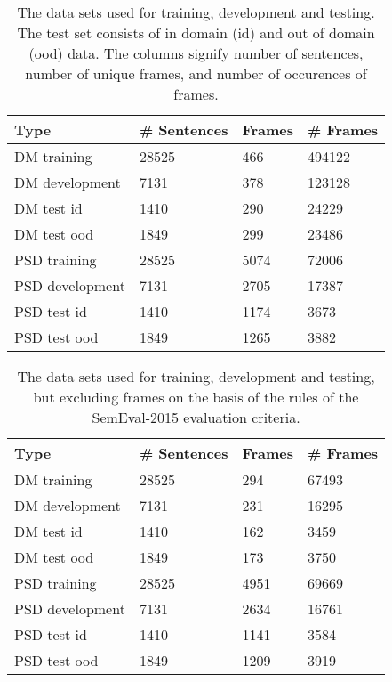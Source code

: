 \begin{table}
    \centering
    \smaller[0.2]
    \begin{tabular}{@{}llll@{}}
        \toprule
        \textbf{Type} & \textbf{\# Sentences} & \textbf{Frames} & \textbf{\# Frames} \\
        \midrule
        DM training & 28525 & 466 & 494122 \\
        DM development & 7131 & 378 & 123128 \\
        DM test id & 1410 & 290 & 24229 \\
        DM test ood & 1849 & 299 & 23486 \\
        \midrule
        PSD training & 28525 & 5074 & 72006 \\
        PSD development & 7131 & 2705 & 17387 \\
        PSD test id & 1410 & 1174 & 3673 \\
        PSD test ood & 1849 & 1265 & 3882 \\
        \bottomrule
    \end{tabular}
    \caption{The data sets used for training, development and testing. The test set consists of in domain (id) and out of domain (ood) data. The columns signify number of sentences, number of unique frames, and number of occurences of frames.}
    \label{table:split}
\end{table}

\begin{table}
    \centering
    \smaller[0.2]
    \begin{tabular}{@{}llll@{}}
        \toprule
        \textbf{Type} & \textbf{\# Sentences} & \textbf{Frames} & \textbf{\# Frames} \\
        \midrule
        DM training & 28525 & 294 & 67493 \\
        DM development & 7131 & 231 & 16295 \\
        DM test id & 1410 & 162 & 3459 \\
        DM test ood & 1849 & 173 & 3750 \\
        \midrule
        PSD training & 28525 & 4951 & 69669 \\
        PSD development & 7131 & 2634 & 16761 \\
        PSD test id & 1410 & 1141 & 3584 \\
        PSD test ood & 1849  & 1209 & 3919 \\
        \bottomrule
    \end{tabular}
    \caption{The data sets used for training, development and testing, but excluding frames on the basis of the rules of the SemEval-2015 evaluation criteria.}
    \label{table:split:VandPred}
\end{table}


